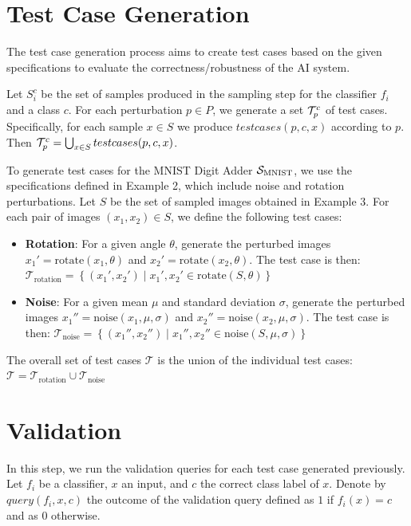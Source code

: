 \section{Test Case Generation}

The test case generation process aims to create test cases based on the given specifications to evaluate the correctness/robustness of the AI system.

Let $S_i^c$ be the set of samples produced in the sampling step for the classifier $f_i$ and a class $c$. For each perturbation $p\in P$, we generate a set $\T_p^c$ of test cases. Specifically, for each sample $x\in S$ we produce $testcases(p,c,x)$ according to $p$. Then $\T_p^c = \bigcup_{x\in S} testcases(p,c,x)$.

\begin{example}
To generate test cases for the MNIST Digit Adder $\S_{\text{MNIST}}$, we use the specifications defined in Example 2, which include noise and rotation perturbations. Let $S$ be the set of sampled images obtained in Example 3. For each pair of images $(x_1, x_2) \in S$, we define the following test cases:
\begin{itemize}
    \item \textbf{Rotation}: For a given angle $\theta$, generate the perturbed images $x_1' = \text{rotate}(x_1, \theta)$ and $x_2' = \text{rotate}(x_2, \theta)$. The test case is then:
    $\mathcal{T}_{\text{rotation}} = \left\{(x_1', x_2') \mid x_1', x_2' \in \text{rotate}(S, \theta)\right\}$
    \item \textbf{Noise}: For a given mean $\mu$ and standard deviation $\sigma$, generate the perturbed images $x_1'' = \text{noise}(x_1, \mu, \sigma)$ and $x_2'' = \text{noise}(x_2, \mu, \sigma)$. The test case is then:
    $\mathcal{T}_{\text{noise}} = \left\{(x_1'', x_2'') \mid x_1'', x_2'' \in \text{noise}(S, \mu, \sigma)\right\}$
\end{itemize}
The overall set of test cases $\mathcal{T}$ is the union of the individual test cases:
$\mathcal{T} = \mathcal{T}_{\text{rotation}} \cup \mathcal{T}_{\text{noise}}$
\end{example}

\section{Validation}

In this step, we run the validation queries for each test case generated previously. Let $f_i$ be a classifier, $x$ an input, and $c$ the correct class label of $x$. Denote by $query(f_i,x,c)$ the outcome of the validation query defined as $1$ if $f_i(x)=c$ and as $0$ otherwise. 

